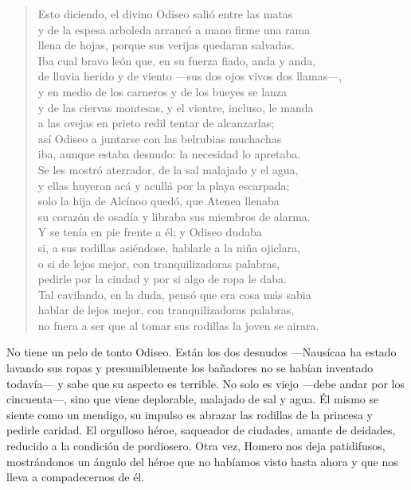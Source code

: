 \documentclass[11pt,a4paper]{article}
\begin{document}
\begin{verse}
Esto diciendo, el divino Odiseo salió entre las matas\\
y de la espesa arboleda arrancó a mano firme una rama\\
llena de hojas, porque sus verijas quedaran salvadas.\\
Iba cual bravo león que, en su fuerza fiado, anda y anda,\\
de lluvia herido y de viento ---sus dos ojos vivos dos llamas---,\\
y en medio de los carneros y de los bueyes se lanza\\
y de las ciervas montesas, y el vientre, incluso, le manda\\
a las ovejas en prieto redil tentar de alcanzarlas;\\
así Odiseo a juntarse con las belrubias muchachas\\
iba, aunque estaba desnudo: la necesidad lo apretaba.\\
Se les mostró aterrador, de la sal malajado y el agua,\\
y ellas huyeron acá y acullá por la playa escarpada;\\
solo la hija de Alcínoo quedó, que Atenea llenaba\\
su corazón de osadía y libraba sus miembros de alarma.\\
Y se tenía en pie frente a él; y Odiseo dudaba\\
si, a sus rodillas asiéndose, hablarle a la niña ojiclara,\\
o si de lejos mejor, con tranquilizadoras palabras,\\
pedirle por la ciudad y por si algo de ropa le daba.\\
Tal cavilando, en la duda, pensó que era cosa más sabia\\
hablar de lejos mejor, con tranquilizadoras palabras,\\
no fuera a ser que al tomar sus rodillas la joven se airara.
\end{verse}

No tiene un pelo de tonto Odiseo. Están los dos desnudos ---Nausícaa ha estado lavando sus ropas y presumiblemente los bañadores no se habían inventado todavía--- y sabe que su aspecto es terrible. No solo es viejo ---debe andar por los cincuenta---, sino que viene deplorable, malajado de sal y agua. Él mismo se siente como un mendigo, su impulso es abrazar las rodillas de la princesa y pedirle caridad. El orgulloso héroe, saqueador de ciudades, amante de deidades, reducido a la condición de pordiosero. Otra vez, Homero nos deja patidifusos, mostrándonos un ángulo del héroe que no habíamos visto hasta ahora y que nos lleva a compadecernos de él.
\end{document}
